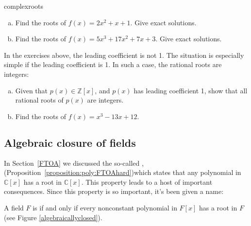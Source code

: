 \begin{exercise}{complexroots}
\begin {enumerate}[(a)]
\item
Find the roots of $f(x)=2x^2+x+1$. Give exact solutions.
\item
Find the roots of $f(x)=5x^3+17x^2+7x+3$. Give exact solutions. 
\end{enumerate}
\end{exercise}
 
In the exercises above, the leading coefficient is not 1. The situation is especially simple if the leading coefficient is 1. In such a case, the rational  roots are integers:

\begin{exercise}{}
\begin{enumerate}[(a)]
\item
Given that $p(x)  \in \mathbb{Z}[x]$, and $p(x)$ has leading coefficient 1, show that all rational roots of $p(x)$ are integers.
\item
Find the roots of $f(x)=x^3-13x+12$.
\end{enumerate}
\end{exercise}


\subsection{Algebraic closure of fields}

In Section~\ref{FTOA} we discussed the so-called , (Proposition~\ref{proposition:poly:FTOAhard})which states that any polynomial in $\mathbb{C}[x]$ has a root in $\mathbb{C}[x]$. This property leads to a host of important consequences.  Since this property is so important, it's been given a name:

\begin{defn}\label{def:algclosed}  
A field $F$ is  if and only if every nonconstant polynomial in $F[x]$ has a root in $F$ (see Figure \ref{algebraicallyclosed}).
\end{defn}

